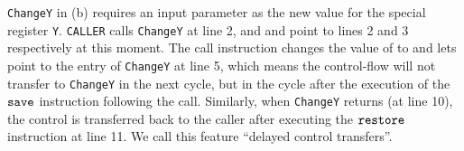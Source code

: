 
\texttt{ChangeY} in \Fig{\ref{fig:An Example for SPARC Code}} (b)
requires an input parameter
as the new value for the special register {\tt Y}.
\texttt{CALLER} calls \texttt{ChangeY} at line 2,
and \pc{} and \npc{} point to lines 2 and 3 respectively at this
moment.
The call instruction changes the value of \pc{} to \npc{}
and lets \npc{} point to the entry of
\texttt{ChangeY} at line 5,
which means the control-flow will not transfer to \texttt{ChangeY}
in the next cycle,
but in the cycle after the execution of the $\texttt{save}$
instruction following the call. Similarly, when
\texttt{ChangeY} returns (at line 10), the control is transferred
back to the caller after executing the $\texttt{restore}$
instruction at line 11.
We call this feature ``delayed control transfers''.

